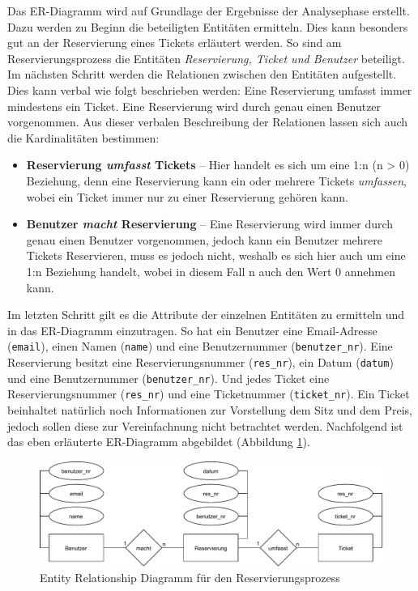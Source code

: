 		Das ER-Diagramm wird auf Grundlage der Ergebnisse der Analysephase erstellt. Dazu werden zu Beginn die beteiligten Entitäten ermitteln. Dies kann besonders gut an der Reservierung eines Tickets erläutert werden. So sind am Reservierungsprozess die Entitäten \textit{Reservierung, Ticket und Benutzer} beteiligt. Im nächsten Schritt werden die Relationen zwischen den Entitäten aufgestellt. Dies kann verbal wie folgt beschrieben werden: Eine Reservierung umfasst immer mindestens ein Ticket. Eine Reservierung wird durch genau einen Benutzer vorgenommen. Aus dieser verbalen Beschreibung der Relationen lassen sich auch die Kardinalitäten bestimmen:
		\begin{itemize}
			\item \textbf{Reservierung \textit{umfasst} Tickets} -- Hier handelt es sich um eine 1:n (n > 0) Beziehung, denn eine Reservierung kann ein oder mehrere Tickets \textit{umfassen}, wobei ein Ticket immer nur zu einer Reservierung gehören kann.
			
			\item  \textbf{Benutzer \textit{macht} Reservierung} -- Eine Reservierung wird immer durch genau einen Benutzer vorgenommen, jedoch kann ein Benutzer mehrere Tickets Reservieren, muss es jedoch nicht, weshalb es sich hier auch um eine 1:n Beziehung handelt, wobei in diesem Fall n auch den Wert 0 annehmen kann. 
		\end{itemize}
		Im letzten Schritt gilt es die Attribute der einzelnen Entitäten zu ermitteln und in das ER-Diagramm einzutragen. So hat ein Benutzer eine Email-Adresse (\texttt{email}), einen Namen (\texttt{name}) und eine Benutzernummer (\texttt{benutzer\_nr}). Eine Reservierung besitzt eine Reservierungsnummer (\texttt{res\_nr}), ein Datum (\texttt{datum}) und eine Benutzernummer (\texttt{benutzer\_nr}). Und jedes Ticket eine Reservierungsnummer (\texttt{res\_nr}) und eine Ticketnummer (\texttt{ticket\_nr}). Ein Ticket beinhaltet natürlich noch Informationen zur Vorstellung dem Sitz und dem Preis, jedoch sollen diese zur Vereinfachnung nicht betrachtet werden. Nachfolgend ist das eben erläuterte ER-Diagramm abgebildet (Abbildung \ref{fig:erdiagramm_reservation}).
		
		\begin{figure}[H]
			\centering 
			\includegraphics[width=13cm]{img/erdiagramm_reservation.pdf}
			\captionsetup{format=hang}
			\caption[ER Datenmodell Reservierungsprozess]{\label{fig:erdiagramm_reservation} Entity Relationship Diagramm für den Reservierungsprozess}
		\end{figure}
		
